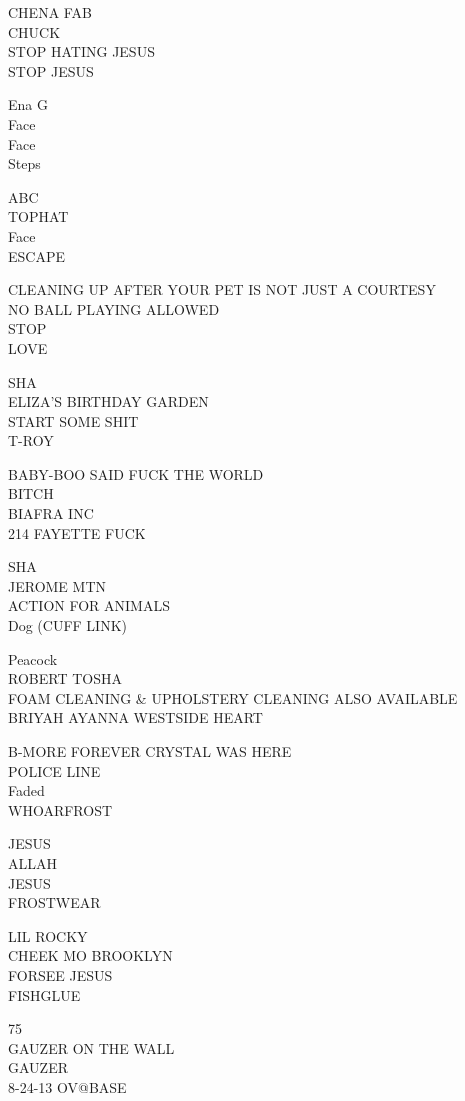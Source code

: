 \documentclass[10pt,letterpaper]{article}
\begin{document}
CHENA FAB\\
CHUCK\\
STOP HATING JESUS\\
STOP JESUS

Ena G\\
Face\\
Face\\
Steps

ABC\\
TOPHAT\\
Face\\
ESCAPE

CLEANING UP AFTER YOUR PET IS NOT JUST A COURTESY\\
NO BALL PLAYING ALLOWED\\
STOP\\
LOVE

SHA\\
ELIZA'S BIRTHDAY GARDEN\\
START SOME SHIT\\
T{-}ROY

BABY{-}BOO SAID FUCK THE WORLD\\
BITCH\\
BIAFRA INC\\
214 FAYETTE FUCK

SHA\\
JEROME MTN\\
ACTION FOR ANIMALS\\
Dog (CUFF LINK)

Peacock\\
ROBERT TOSHA\\
FOAM CLEANING \& UPHOLSTERY CLEANING ALSO AVAILABLE\\
BRIYAH AYANNA WESTSIDE HEART

B{-}MORE FOREVER CRYSTAL WAS HERE\\
POLICE LINE\\
Faded\\
WHOARFROST

JESUS\\
ALLAH\\
JESUS\\
FROSTWEAR

LIL ROCKY\\
CHEEK MO BROOKLYN\\
FORSEE JESUS\\
FISHGLUE

75\\
GAUZER ON THE WALL\\
GAUZER\\
8{-}24{-}13 OV@BASE
\end{document}
